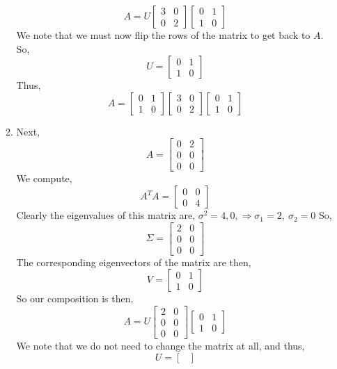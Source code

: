 \documentclass[letterpaper,10pt]{article}
\begin{document}
\begin{enumerate}
\begin{enumerate}
\[A=U\begin{bmatrix}
3 & 0\\0 & 2
\end{bmatrix} \begin{bmatrix}
0 & 1\\1 & 0
\end{bmatrix}\]
We note that we must now flip the rows of the matrix to get back to $A$. So,
\[U=\begin{bmatrix}
0 & 1\\1& 0
\end{bmatrix} \]
Thus,
\[A=\begin{bmatrix}
0 & 1\\1& 0
\end{bmatrix}\begin{bmatrix}
3 & 0\\0 & 2
\end{bmatrix} \begin{bmatrix}
0 & 1\\1 & 0
\end{bmatrix}\]
\item Next,
\[A=\begin{bmatrix}
0 & 2\\ 0 & 0\\ 0 & 0
\end{bmatrix} \]
We compute,
\[A^TA=\begin{bmatrix}
0 & 0\\0 & 4
\end{bmatrix}\]
Clearly the eigenvalues of this matrix are, $\sigma^2=4,0, \Rightarrow \sigma_1=2,\ \sigma_2=0$
So,
\[\Sigma=\begin{bmatrix}
2 & 0\\0 & 0\\ 0 & 0
\end{bmatrix} \]
The corresponding eigenvectors of the matrix are then,
\[V=\begin{bmatrix}
0 & 1\\1 & 0
\end{bmatrix} \]
So our composition is then,
\[A=U\begin{bmatrix}
2 & 0\\0 & 0\\0 &0
\end{bmatrix} \begin{bmatrix}
0 & 1\\1 & 0
\end{bmatrix}\]
We note that we do not need to change the matrix at all, and thus,
\[U=\begin{bmatrix}

\end{bmatrix}\]
\end{enumerate}
\end{enumerate}
\end{document}
